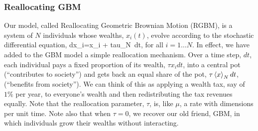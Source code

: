 %
%
%


\subsubsection{Reallocating GBM}
Our model, called Reallocating Geometric Brownian Motion (RGBM), is a system of $N$ individuals whose wealths, $x_i(t)$, evolve according to the stochastic differential equation,
\be
dx_i=x_i + tau_N\ dt,
\ee
for all $i=1\dots N$. In effect, we have added to the GBM model a simple reallocation mechanism. Over a time step, $dt$, each individual pays a fixed proportion of its wealth, $\tau x_i dt$, into a central pot (``contributes to society'') and gets back an equal share of the pot, $\tau\left\langle x \right\rangle_N dt$, (``benefits from society''). We can think of this as applying a wealth tax, say of $1\%$ per year, to everyone's wealth and then redistributing the tax revenues equally. Note that the reallocation parameter, $\tau$, is, like $\mu$, a rate with dimensions per unit time. Note also that when $\tau=0$, we recover our old friend, GBM, in which individuals grow their wealths without interacting.

